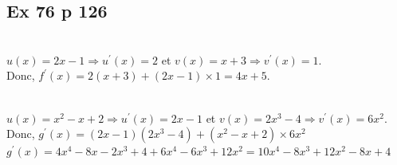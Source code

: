 \documentclass[12pt,a5paper]{book}
\begin{document}
\subsection*{Ex 76 p 126}
\begin{enumMet}
    \item {}\\
    $u(x)=2 x-1 \Rightarrow u^{\prime}(x)=2$ et $v(x)=x+3 \Rightarrow v^{\prime}(x)=1$.\\
    Donc, $f^{\prime}(x)=2(x+3)+(2 x-1) \times 1=4 x+5$.
    \item {}\\
    $u(x)=x^{2}-x+2 \Rightarrow u^{\prime}(x)=2 x-1$ et
$v(x)=2 x^{3}-4 \Rightarrow v^{\prime}(x)=6 x^{2} .$\\
Donc, $g^{\prime}(x)=(2 x-1)\left(2 x^{3}-4\right)+\left(x^{2}-x+2\right) \times 6 x^{2}$\\
$g^{\prime}(x)=4 x^{4}-8 x-2 x^{3}+4+6 x^{4}-6 x^{3}+12 x^{2}=10 x^{4}-8 x^{3}+12 x^{2}-8 x+4$
\end{enumMet}

\newpage
\end{document}
